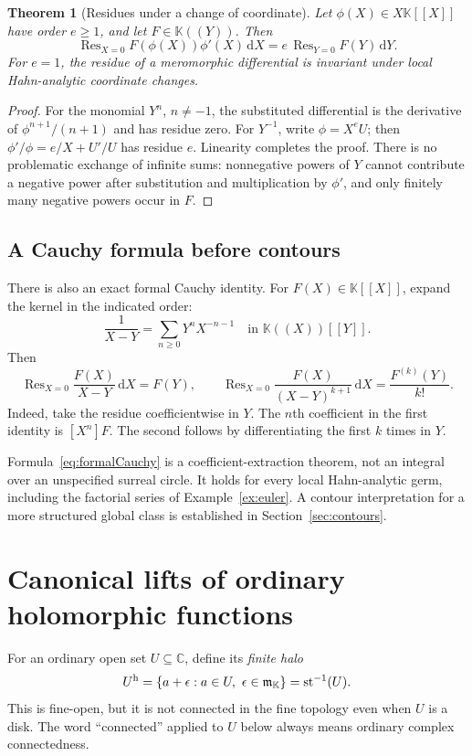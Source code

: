 \documentclass[11pt,a4paper]{article}
\newtheorem{theorem}{Theorem}[section]
\theoremstyle{definition}\newtheorem{definition}[theorem]{Definition}
\theoremstyle{remark}\newtheorem{remark}[theorem]{Remark}
\newcommand{\K}{\mathbb K}
\newcommand{\C}{\mathbb C}\newcommand{\R}{\mathbb R}\newcommand{\N}{\mathbb N}\newcommand{\Z}{\mathbb Z}
\newcommand{\st}{\operatorname{st}}\newcommand{\supp}{\operatorname{supp}}
\newcommand{\Res}{\operatorname{Res}}\newcommand{\ord}{\operatorname{ord}}
\newcommand{\halo}[1]{#1^{\mathrm h}}
\newcommand{\dd}{\,\mathrm d}
\numberwithin{equation}{section}
\begin{document}
\begin{theorem}[Residues under a change of coordinate]\label{thm:reschange}
Let $\phi(X)\in X\K[[X]]$ have order $e\geq1$, and let $F\in\K((Y))$. Then
\[
 \Res_{X=0}F(\phi(X))\phi'(X)\dd X
 =e\,\Res_{Y=0}F(Y)\dd Y.
\]
For $e=1$, the residue of a meromorphic differential is invariant under local Hahn-analytic coordinate changes.
\end{theorem}
\begin{proof}
For the monomial $Y^n$, $n\ne-1$, the substituted differential is the derivative of $\phi^{n+1}/(n+1)$ and has residue zero. For $Y^{-1}$, write $\phi=X^eU$; then $\phi'/\phi=e/X+U'/U$ has residue $e$. Linearity completes the proof. There is no problematic exchange of infinite sums: nonnegative powers of $Y$ cannot contribute a negative power after substitution and multiplication by $\phi'$, and only finitely many negative powers occur in $F$.
\end{proof}

\subsection{A Cauchy formula before contours}
There is also an exact formal Cauchy identity. For $F(X)\in\K[[X]]$, expand the kernel in the indicated order:
\[
 \frac1{X-Y}=\sum_{n\geq0}Y^nX^{-n-1}
 \quad\text{in }\K((X))[[Y]].
\]
Then
\begin{equation}\label{eq:formalCauchy}
 \Res_{X=0}\frac{F(X)}{X-Y}\dd X=F(Y),
 \qquad
 \Res_{X=0}\frac{F(X)}{(X-Y)^{k+1}}\dd X
 =\frac{F^{(k)}(Y)}{k!}.
\end{equation}
Indeed, take the residue coefficientwise in $Y$. The $n$th coefficient in the first identity is $[X^n]F$. The second follows by differentiating the first $k$ times in $Y$.

Formula~\eqref{eq:formalCauchy} is a coefficient-extraction theorem, not an integral over an unspecified surreal circle. It holds for every local Hahn-analytic germ, including the factorial series of Example~\ref{ex:euler}. A contour interpretation for a more structured global class is established in Section~\ref{sec:contours}.

\section{Canonical lifts of ordinary holomorphic functions}\label{sec:canonical}

For an ordinary open set $U\subseteq\C$, define its \emph{finite halo}
\[
 \halo U=\{a+\epsilon:a\in U,\ \epsilon\in\infinit\}=\st^{-1}(U).
\]
This is fine-open, but it is not connected in the fine topology even when $U$ is a disk. The word ``connected'' applied to $U$ below always means ordinary complex connectedness.
\end{document}
